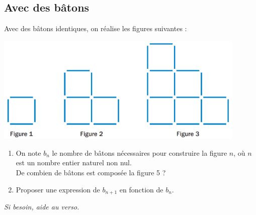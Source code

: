 \documentclass[a4paper,11pt,exos]{nsi} %
\begin{document}
\newpage
\subsection{Avec des bâtons}

Avec des bâtons identiques, on réalise les figures suivantes :
\begin{center}
	\includegraphics[width=12cm]{batons}
\end{center}
\begin{enumerate}
	\item 	On note $b_n$ le nombre de bâtons nécessaires pour construire la figure $n$, où $n$ est un nombre entier naturel non nul.\\
	De combien de bâtons est composée la figure 5 ?\\[0.5em]
	\item 	Proposer une expression de $b_{n+1}$ en fonction de $b_n$.\\[0.5em]
\end{enumerate}
\textit{Si besoin, aide au verso.}
\end{document}
